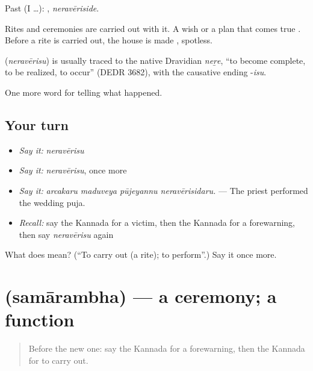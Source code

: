 Past (I …): , \emph{neravēriside}.

Rites and ceremonies are carried out with it. A wish or a plan that comes true . Before a rite is carried out, the house is made , spotless.

\begin{cousinweb}
\textbf{} (\emph{neravērisu}) is usually traced to the native Dravidian \emph{neṟe}, \textquotedblleft{}to become complete, to be realized, to occur\textquotedblright{} (DEDR 3682), with the causative ending -\emph{isu}.
\end{cousinweb}

\begin{grammarlens}[title={What you've built}]
One more word for telling what happened.
\end{grammarlens}

\subsection*{Your turn}
\begin{itemize}
\raggedright
  \item \emph{Say it:} \emph{neravērisu}
  \item \emph{Say it:} \emph{neravērisu}, once more
  \item \emph{Say it:} \emph{arcakaru maduveya pūjeyannu neravērisidaru.} — The priest performed the wedding puja.
  \item \emph{Recall:} say the Kannada for a victim, then the Kannada for a forewarning, then say \emph{neravērisu} again
\end{itemize}

\begin{tcolorbox}[breakable,colback=teal!4,colframe=teal!35!black,title={Before you move on}]
What does  mean? (\textquotedblleft{}To carry out (a rite); to perform\textquotedblright{}.) Say it once more.
\end{tcolorbox}
\section[\texorpdfstring{\kn{ಸಮಾರಂಭ} (samārambha)}{ಸಮಾರಂಭ (samārambha)}]{ (samārambha) — a ceremony; a function}

\label{lesson:KA-C333-samarambha}



\begin{quote}
Before the new one: say the Kannada for a forewarning, then the Kannada for to carry out.
\end{quote}

